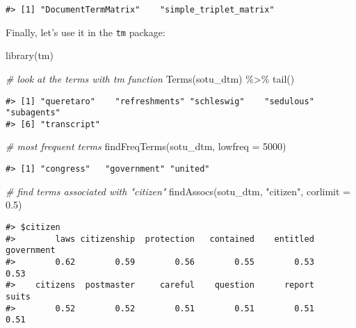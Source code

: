 \documentclass[
]{book}
\newenvironment{Shaded}{\begin{snugshade}}{\end{snugshade}}
\newcommand{\AttributeTok}[1]{\textcolor[rgb]{0.77,0.63,0.00}{#1}}
\newcommand{\CommentTok}[1]{\textcolor[rgb]{0.56,0.35,0.01}{\textit{#1}}}
\newcommand{\DecValTok}[1]{\textcolor[rgb]{0.00,0.00,0.81}{#1}}
\newcommand{\FloatTok}[1]{\textcolor[rgb]{0.00,0.00,0.81}{#1}}
\newcommand{\FunctionTok}[1]{\textcolor[rgb]{0.00,0.00,0.00}{#1}}
\newcommand{\NormalTok}[1]{#1}
\newcommand{\SpecialCharTok}[1]{\textcolor[rgb]{0.00,0.00,0.00}{#1}}
\newcommand{\StringTok}[1]{\textcolor[rgb]{0.31,0.60,0.02}{#1}}
\begin{document}
\begin{verbatim}
#> [1] "DocumentTermMatrix"    "simple_triplet_matrix"
\end{verbatim}

Finally, let's use it in the \texttt{tm} package:

\begin{Shaded}
\begin{Highlighting}[]
\FunctionTok{library}\NormalTok{(tm)}

\CommentTok{\# look at the terms with tm function}
\FunctionTok{Terms}\NormalTok{(sotu\_dtm) }\SpecialCharTok{\%\textgreater{}\%} \FunctionTok{tail}\NormalTok{()}
\end{Highlighting}
\end{Shaded}

\begin{verbatim}
#> [1] "queretaro"    "refreshments" "schleswig"    "sedulous"     "subagents"   
#> [6] "transcript"
\end{verbatim}

\begin{Shaded}
\begin{Highlighting}[]
\CommentTok{\# most frequent terms}
\FunctionTok{findFreqTerms}\NormalTok{(sotu\_dtm, }\AttributeTok{lowfreq =} \DecValTok{5000}\NormalTok{)}
\end{Highlighting}
\end{Shaded}

\begin{verbatim}
#> [1] "congress"   "government" "united"
\end{verbatim}

\begin{Shaded}
\begin{Highlighting}[]
\CommentTok{\# find terms associated with "citizen"}
\FunctionTok{findAssocs}\NormalTok{(sotu\_dtm, }\StringTok{"citizen"}\NormalTok{, }\AttributeTok{corlimit =} \FloatTok{0.5}\NormalTok{)}
\end{Highlighting}
\end{Shaded}

\begin{verbatim}
#> $citizen
#>        laws citizenship  protection   contained    entitled  government 
#>        0.62        0.59        0.56        0.55        0.53        0.53 
#>    citizens  postmaster     careful    question      report       suits 
#>        0.52        0.52        0.51        0.51        0.51        0.51
\end{verbatim}
\end{document}
